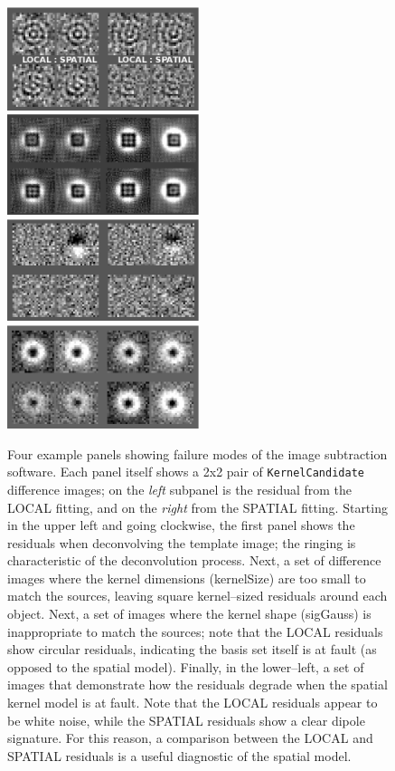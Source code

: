 \documentclass[prd, nofootinbib, floatfix, 11pt,tightenlines,times]{article}
\begin{document}
{\begin{figure}
\includegraphics[width=0.5\textwidth, height=0.25\textwidth]{figures/deconv2.eps} 
\includegraphics[width=0.5\textwidth, height=0.25\textwidth]{figures/size2.eps} \\
\includegraphics[width=0.5\textwidth, height=0.25\textwidth]{figures/order2.eps} 
\includegraphics[width=0.5\textwidth, height=0.25\textwidth]{figures/shape2.eps} \\
\caption{Four example panels showing failure modes of the image
  subtraction software.  Each panel itself shows a 2x2 pair of
  {\tt KernelCandidate} difference images; on the {\it left} subpanel is the residual from
  the LOCAL fitting, and on the {\it right} from the SPATIAL fitting.
  Starting in the upper left and going clockwise, the first panel
  shows the residuals when deconvolving the template image; the
  ringing is characteristic of the deconvolution process.  Next, a set
  of difference images where the kernel dimensions (kernelSize) are
  too small to match the sources, leaving square kernel--sized
  residuals around each object.  Next, a set of images where the
  kernel shape (sigGauss) is inappropriate to match the sources; note
  that the LOCAL residuals show circular residuals, indicating the
  basis set itself is at fault (as opposed to the spatial model).
  Finally, in the lower--left, a set of images that demonstrate how
  the residuals degrade when the spatial kernel model is at fault.
  Note that the LOCAL residuals appear to be white noise, while the
  SPATIAL residuals show a clear dipole signature.  For this reason, a
  comparison between the LOCAL and SPATIAL residuals is a useful
  diagnostic of the spatial model.  }
\label{fig_galleryBad}
\end{figure}

}
\end{document}
